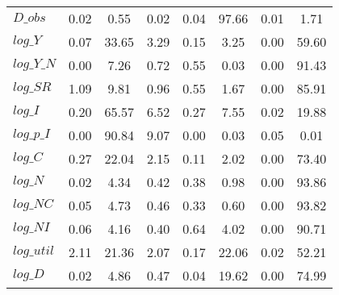 \begin{center}
\begin{longtable}{lccccccc}
$D\_obs     $	 & 	        0.02	 & 	        0.55	 & 	        0.02	 & 	        0.04	 & 	       97.66	 & 	        0.01	 & 	        1.71 \\ 
$log\_Y     $	 & 	        0.07	 & 	       33.65	 & 	        3.29	 & 	        0.15	 & 	        3.25	 & 	        0.00	 & 	       59.60 \\ 
$log\_Y\_N  $	 & 	        0.00	 & 	        7.26	 & 	        0.72	 & 	        0.55	 & 	        0.03	 & 	        0.00	 & 	       91.43 \\ 
$log\_SR    $	 & 	        1.09	 & 	        9.81	 & 	        0.96	 & 	        0.55	 & 	        1.67	 & 	        0.00	 & 	       85.91 \\ 
$log\_I     $	 & 	        0.20	 & 	       65.57	 & 	        6.52	 & 	        0.27	 & 	        7.55	 & 	        0.02	 & 	       19.88 \\ 
$log\_p\_I  $	 & 	        0.00	 & 	       90.84	 & 	        9.07	 & 	        0.00	 & 	        0.03	 & 	        0.05	 & 	        0.01 \\ 
$log\_C     $	 & 	        0.27	 & 	       22.04	 & 	        2.15	 & 	        0.11	 & 	        2.02	 & 	        0.00	 & 	       73.40 \\ 
$log\_N     $	 & 	        0.02	 & 	        4.34	 & 	        0.42	 & 	        0.38	 & 	        0.98	 & 	        0.00	 & 	       93.86 \\ 
$log\_NC    $	 & 	        0.05	 & 	        4.73	 & 	        0.46	 & 	        0.33	 & 	        0.60	 & 	        0.00	 & 	       93.82 \\ 
$log\_NI    $	 & 	        0.06	 & 	        4.16	 & 	        0.40	 & 	        0.64	 & 	        4.02	 & 	        0.00	 & 	       90.71 \\ 
$log\_util  $	 & 	        2.11	 & 	       21.36	 & 	        2.07	 & 	        0.17	 & 	       22.06	 & 	        0.02	 & 	       52.21 \\ 
$log\_D     $	 & 	        0.02	 & 	        4.86	 & 	        0.47	 & 	        0.04	 & 	       19.62	 & 	        0.00	 & 	       74.99 \\ 
\end{longtable}
 \end{center}
